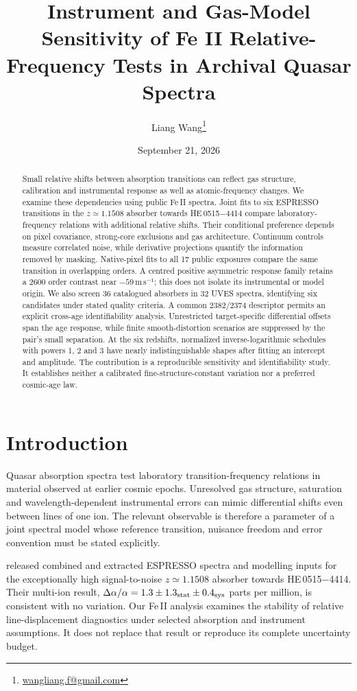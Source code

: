 \documentclass[11pt,a4paper]{article}
\title{Instrument and Gas-Model Sensitivity of Fe II Relative-Frequency Tests in Archival Quasar Spectra}
\author{Liang Wang\thanks{\href{mailto:wangliang.f@gmail.com}{wangliang.f@gmail.com}}}
\date{September 21, 2026}
\begin{document}
\maketitle
\begin{abstract}
Small relative shifts between absorption transitions can reflect gas structure, calibration and instrumental response as well as atomic-frequency changes. We examine these dependencies using public Fe\,II spectra. Joint fits to six ESPRESSO transitions in the $z\simeq1.1508$ absorber towards HE\,0515$-$4414 compare laboratory-frequency relations with additional relative shifts. Their conditional preference depends on pixel covariance, strong-core exclusions and gas architecture. Continuum controls measure correlated noise, while derivative projections quantify the information removed by masking. Native-pixel fits to all 17 public exposures compare the same transition in overlapping orders. A centred positive asymmetric response family retains a 2600 order contrast near $-59\,\mathrm{m\,s^{-1}}$; this does not isolate its instrumental or model origin. We also screen 36 catalogued absorbers in 32 UVES spectra, identifying six candidates under stated quality criteria. A common 2382/2374 descriptor permits an explicit cross-age identifiability analysis. Unrestricted target-specific differential offsets span the age response, while finite smooth-distortion scenarios are suppressed by the pair's small separation. At the six redshifts, normalized inverse-logarithmic schedules with powers 1, 2 and 3 have nearly indistinguishable shapes after fitting an intercept and amplitude. The contribution is a reproducible sensitivity and identifiability study. It establishes neither a calibrated fine-structure-constant variation nor a preferred cosmic-age law.
\end{abstract}

\section{Introduction}
\label{sec:introduction}
Quasar absorption spectra test laboratory transition-frequency relations in material observed at earlier cosmic epochs. Unresolved gas structure, saturation and wavelength-dependent instrumental errors can mimic differential shifts even between lines of one ion. The relevant observable is therefore a parameter of a joint spectral model whose reference transition, nuisance freedom and error convention must be stated explicitly.

\citet{Murphy2022ESPRESSO} released combined and extracted ESPRESSO spectra and modelling inputs for the exceptionally high signal-to-noise $z\simeq1.1508$ absorber towards HE\,0515$-$4414. Their multi-ion result, $\Delta\alpha/\alpha=1.3\pm1.3_{\rm stat}\pm0.4_{\rm sys}$ parts per million, is consistent with no variation. Our Fe\,II analysis examines the stability of relative line-displacement diagnostics under selected absorption and instrument assumptions. It does not replace that result or reproduce its complete uncertainty budget.
\end{document}
